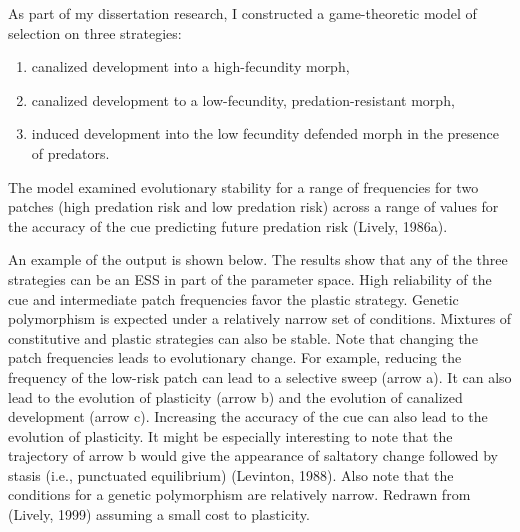 \documentclass[
  letterpaper,
]{book}
\begin{document}
\begin{tcolorbox}[enhanced jigsaw, rightrule=.15mm, bottomtitle=1mm, opacitybacktitle=0.6, titlerule=0mm, opacityback=0, colbacktitle=quarto-callout-note-color!10!white, arc=.35mm, coltitle=black, title=\textcolor{quarto-callout-note-color}{\faInfo}\hspace{0.5em}{Box 3.1.}, breakable, left=2mm, bottomrule=.15mm, leftrule=.75mm, toptitle=1mm, toprule=.15mm, colframe=quarto-callout-note-color-frame, colback=white]

As part of my dissertation research, I constructed a game-theoretic
model of selection on three strategies:

\begin{enumerate}
\def\labelenumi{\arabic{enumi}.}
\item
  canalized development into a high-fecundity morph,
\item
  canalized development to a low-fecundity, predation-resistant morph,
\item
  induced development into the low fecundity defended morph in the
  presence of predators.
\end{enumerate}

The model examined evolutionary stability for a range of frequencies for
two patches (high predation risk and low predation risk) across a range
of values for the accuracy of the cue predicting future predation risk
(Lively, 1986a).

An example of the output is shown below. The results show that any of
the three strategies can be an ESS in part of the parameter
space.\footnotemark{} High reliability of the cue and intermediate patch
frequencies favor the plastic strategy. Genetic polymorphism is expected
under a relatively narrow set of conditions. Mixtures of constitutive
and plastic strategies can also be stable. Note that changing the patch
frequencies leads to evolutionary change. For example, reducing the
frequency of the low-risk patch can lead to a selective sweep (arrow a).
It can also lead to the evolution of plasticity (arrow b) and the
evolution of canalized development (arrow c). Increasing the accuracy of
the cue can also lead to the evolution of plasticity. It might be
especially interesting to note that the trajectory of arrow b would give
the appearance of saltatory change followed by stasis (i.e., punctuated
equilibrium) (Levinton, 1988). Also note that the conditions for a
genetic polymorphism are relatively narrow. Redrawn from (Lively, 1999)
assuming a small cost to plasticity.


\end{tcolorbox}
\end{document}
